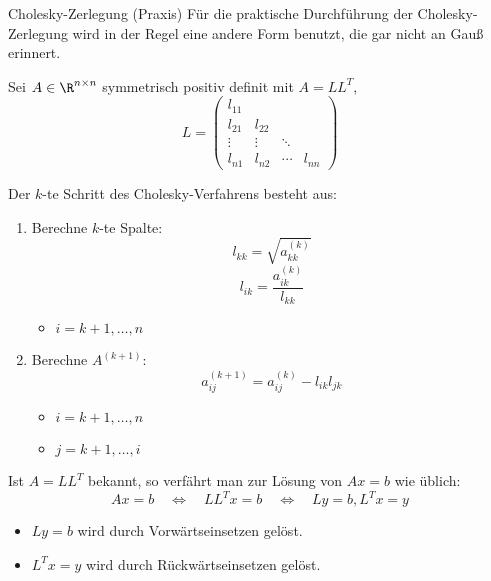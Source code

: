 \begin{defi}{Cholesky-Zerlegung (Praxis)}
    Für die praktische Durchführung der Cholesky-Zerlegung wird in der Regel eine andere Form benutzt, die gar nicht an Gauß erinnert.

    Sei $A \in \R^{n \times n}$ symmetrisch positiv definit mit $A = LL^T$,
    \[
        L = \begin{pmatrix}
            l_{11} &        &        &        \\
            l_{21} & l_{22} &        &        \\
            \vdots & \vdots & \ddots &        \\
            l_{n1} & l_{n2} & \cdots & l_{nn}
        \end{pmatrix}
    \]

    Der $k$-te Schritt des Cholesky-Verfahrens besteht aus:
    \begin{enumerate}
        \item Berechne $k$-te Spalte:
              \[
                  l_{kk} = \sqrt{a^{(k)}_{kk}}
              \]
              \[
                  l_{ik} = \frac{a^{(k)}_{ik}}{l_{kk}}
              \]
              \begin{itemize}
                  \item $i = k + 1, \ldots, n$
              \end{itemize}
        \item Berechne $A^{(k+1)}$:
              \[
                  a^{(k+1)}_{ij} = a^{(k)}_{ij} - l_{ik} l_{jk}
              \]
              \begin{itemize}
                  \item $i = k + 1, \ldots, n$
                  \item $j = k + 1, \ldots, i$
              \end{itemize}
    \end{enumerate}

    Ist $A = LL^T$ bekannt, so verfährt man zur Lösung von $Ax = b$ wie üblich:
    \[
        Ax = b \quad \iff \quad LL^Tx = b \quad \iff \quad Ly = b, L^Tx = y
    \]
    \begin{itemize}
        \item $Ly = b$ wird durch Vorwärtseinsetzen gelöst.
        \item $L^Tx = y$ wird durch Rückwärtseinsetzen gelöst.
    \end{itemize}
\end{defi}


